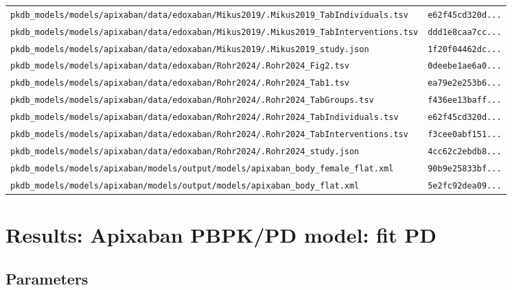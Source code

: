 \documentclass{article}
\begin{document}
\begin{longtable}{ll}
\texttt{pkdb\_models/models/apixaban/data/edoxaban/Mikus2019/.Mikus2019\_TabIndividuals.tsv} & \texttt{e62f45cd320d...} \\
\texttt{pkdb\_models/models/apixaban/data/edoxaban/Mikus2019/.Mikus2019\_TabInterventions.tsv} & \texttt{ddd1e8caa7cc...} \\
\texttt{pkdb\_models/models/apixaban/data/edoxaban/Mikus2019/.Mikus2019\_study.json} & \texttt{1f20f04462dc...} \\
\texttt{pkdb\_models/models/apixaban/data/edoxaban/Rohr2024/.Rohr2024\_Fig2.tsv} & \texttt{0deebe1ae6a0...} \\
\texttt{pkdb\_models/models/apixaban/data/edoxaban/Rohr2024/.Rohr2024\_Tab1.tsv} & \texttt{ea79e2e253b6...} \\
\texttt{pkdb\_models/models/apixaban/data/edoxaban/Rohr2024/.Rohr2024\_TabGroups.tsv} & \texttt{f436ee13baff...} \\
\texttt{pkdb\_models/models/apixaban/data/edoxaban/Rohr2024/.Rohr2024\_TabIndividuals.tsv} & \texttt{e62f45cd320d...} \\
\texttt{pkdb\_models/models/apixaban/data/edoxaban/Rohr2024/.Rohr2024\_TabInterventions.tsv} & \texttt{f3cee0abf151...} \\
\texttt{pkdb\_models/models/apixaban/data/edoxaban/Rohr2024/.Rohr2024\_study.json} & \texttt{4cc62c2ebdb8...} \\
\texttt{pkdb\_models/models/apixaban/models/output/models/apixaban\_body\_female\_flat.xml} & \texttt{90b9e25833bf...} \\
\texttt{pkdb\_models/models/apixaban/models/output/models/apixaban\_body\_flat.xml} & \texttt{5e2fc92dea09...} \\
\end{longtable}

\section{Results: Apixaban PBPK/PD model: fit PD}

\subsection{Parameters}
\end{document}
